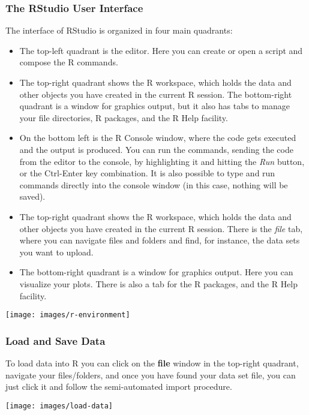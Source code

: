 \documentclass[
]{article}
\providecommand{\tightlist}{%
  \setlength{\itemsep}{0pt}\setlength{\parskip}{0pt}}
\begin{document}
\subsubsection{The RStudio User Interface}\label{the-rstudio-user-interface}

The interface of RStudio is organized in four main quadrants:

\begin{itemize}
\tightlist
\item
  The top-left quadrant is the editor. Here you can create or open a script and compose the R commands.
\item
  The top-right quadrant shows the R workspace, which holds the data and other objects you have created in the current R session. The bottom-right quadrant is a window for graphics output, but it also has tabs to manage your file directories, R packages, and the R Help facility.
\item
  On the bottom left is the R Console window, where the code gets executed and the output is produced. You can run the commands, sending the code from the editor to the console, by highlighting it and hitting the \emph{Run} button, or the Ctrl-Enter key combination. It is also possible to type and run commands directly into the console window (in this case, nothing will be saved).
\item
  The top-right quadrant shows the R workspace, which holds the data and other objects you have created in the current R session. There is the \emph{file} tab, where you can navigate files and folders and find, for instance, the data sets you want to upload.
\item
  The bottom-right quadrant is a window for graphics output. Here you can visualize your plots. There is also a tab for the R packages, and the R Help facility.
\end{itemize}

\texttt{[image: images/r-environment]}

\subsubsection{Load and Save Data}\label{load-and-save-data}

To load data into R you can click on the \textbf{file} window in the top-right quadrant, navigate your files/folders, and once you have found your data set file, you can just click it and follow the semi-automated import procedure.

\texttt{[image: images/load-data]}
\end{document}
